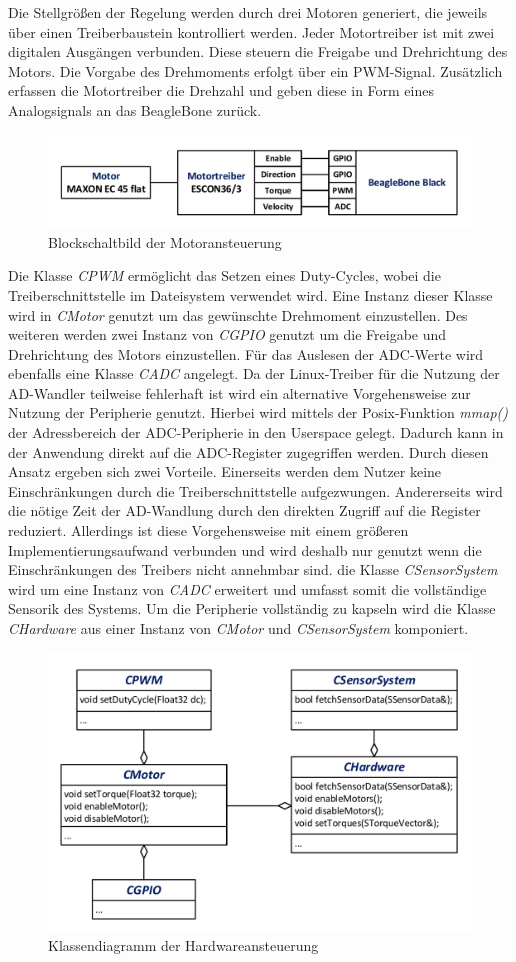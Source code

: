 Die Stellgrößen der Regelung werden durch drei Motoren generiert, die jeweils über einen Treiberbaustein kontrolliert werden. Jeder Motortreiber ist mit zwei digitalen Ausgängen verbunden. Diese steuern die Freigabe und Drehrichtung des Motors. Die Vorgabe des Drehmoments erfolgt über ein PWM-Signal. Zusätzlich erfassen die Motortreiber die Drehzahl und geben diese in Form eines Analogsignals an das BeagleBone zurück.
\begin{figure}[!h]
\centering
\includegraphics[width=0.7\linewidth]{img/SW_0_Motoren_BSB.pdf}
\caption{Blockschaltbild der Motoransteuerung} 
\end{figure}
Die Klasse \textit{CPWM} ermöglicht das Setzen eines Duty-Cycles, wobei die Treiberschnittstelle im Dateisystem verwendet wird. Eine Instanz dieser Klasse wird in \textit{CMotor} genutzt um das gewünschte Drehmoment einzustellen. Des weiteren werden zwei Instanz von \textit{CGPIO} genutzt um die Freigabe und Drehrichtung des Motors einzustellen. Für das Auslesen der ADC-Werte wird ebenfalls eine Klasse \textit{CADC} angelegt. Da der Linux-Treiber für die Nutzung der AD-Wandler teilweise fehlerhaft ist wird ein alternative Vorgehensweise zur Nutzung der Peripherie genutzt. Hierbei wird mittels der Posix-Funktion \textit{mmap()} der Adressbereich der ADC-Peripherie in den Userspace gelegt. Dadurch kann in der Anwendung direkt auf die ADC-Register zugegriffen werden. Durch diesen Ansatz ergeben sich zwei Vorteile. Einerseits werden dem Nutzer keine Einschränkungen durch die Treiberschnittstelle aufgezwungen. Andererseits wird die nötige Zeit der AD-Wandlung durch den direkten Zugriff auf die Register reduziert. Allerdings ist diese Vorgehensweise mit einem größeren Implementierungsaufwand verbunden und wird deshalb nur genutzt wenn die Einschränkungen des Treibers nicht annehmbar sind.
die Klasse \textit{CSensorSystem} wird um eine Instanz von \textit{CADC} erweitert und umfasst somit die vollständige Sensorik des Systems. Um die Peripherie vollständig zu kapseln wird die Klasse \textit{CHardware} aus einer Instanz von \textit{CMotor} und \textit{CSensorSystem} komponiert.
\begin{figure}[!h]
\centering
\includegraphics[width=0.7\linewidth]{img/SW_0_Hardware_KD.pdf}
\caption{Klassendiagramm der Hardwareansteuerung}
\end{figure}
